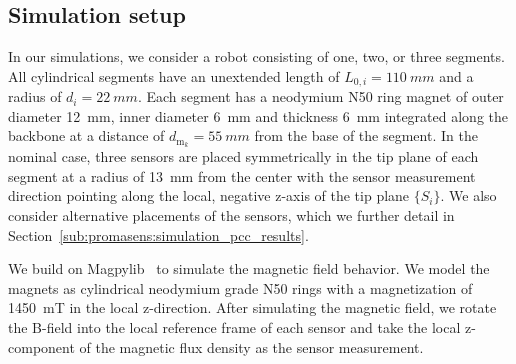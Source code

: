 \subsection{Simulation setup}\label{sub:promasens:pcc_simulations:simulation_setup}
In our simulations, we consider a robot consisting of one, two, or three segments. %
All cylindrical segments have an unextended length of $L_{0,i} = \SI{110}{mm}$ and a radius of $d_i = \SI{22}{mm}$. Each segment has a neodymium N50 ring magnet of outer diameter \SI{12}{mm}, inner diameter \SI{6}{mm} and thickness \SI{6}{mm} integrated along the backbone at a distance of $d_{\mathrm{m}_k} = \SI{55}{mm}$ from the base of the segment.
In the nominal case, three sensors are placed symmetrically in the tip plane of each segment at a radius of \SI{13}{mm} from the center with the sensor measurement direction pointing along the local, negative z-axis of the tip plane $\{S_i\}$. We also consider alternative placements of the sensors, which we further detail in Section~\ref{sub:promasens:simulation_pcc_results}.

We build on Magpylib~\citep{magpylib2020} to simulate the magnetic field behavior.
We model the magnets as cylindrical neodymium grade N50 rings with a magnetization of \SI{1450}{mT} in the local z-direction. 
After simulating the magnetic field, we rotate the B-field into the local reference frame of each sensor and take the local z-component of the magnetic flux density as the sensor measurement.

